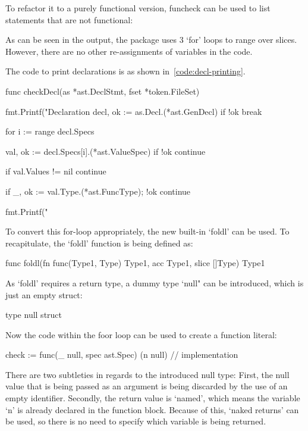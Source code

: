 To refactor it to a purely functional version, funcheck can be used to
list statements that are not functional:

As can be seen in the output, the package uses 3 `for' loops to range over
slices. However, there are no other re-assignments of variables in the code.

The code to print declarations is as shown in~\ref{code:decl-printing}.

\begin{code}
	\label{code:decl-printing}
\begin{gocode}
func checkDecl(as *ast.DeclStmt, fset *token.FileSet) {
	fmt.Printf("Declaration %
	decl, ok := as.Decl.(*ast.GenDecl)
	if !ok {
		break
	}

	for i := range decl.Specs {
		val, ok := decl.Specs[i].(*ast.ValueSpec)
		if !ok {
			continue
		}

		if val.Values != nil {
			continue
		}

		if _, ok := val.Type.(*ast.FuncType); !ok {
			continue
		}

		fmt.Printf("\tIdent %
	}
}
\end{gocode}
\end{code}
To convert this for-loop appropriately, the new built-in `foldl' can be used.
To recapitulate, the `foldl' function is being defined as:
\begin{gocode}
func foldl(fn func(Type1, Type) Type1, acc Type1, slice []Type) Type1
\end{gocode}
As `foldl' requires a return type, a dummy type `null" can be introduced, which
is just an empty struct:
\begin{gocode}
type null struct{}
\end{gocode}
Now the code within the foor loop can be used to create a function literal:
\begin{gocode}
check := func(_ null, spec ast.Spec) (n null) {
	// implementation
}
\end{gocode}
There are two subtleties in regards to the introduced null type:
First, the null value that is being passed as an argument is being discarded
by the use of an empty identifier.
Secondly, the return value is `named', which means the variable `n' is
already declared in the function block. Because of this, `naked returns' can
be used, so there is no need to specify which variable is being returned.


